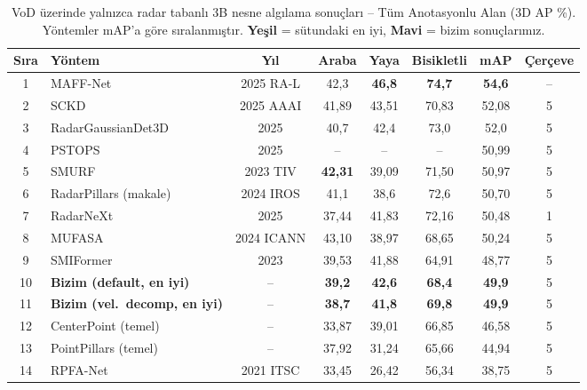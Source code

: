 \documentclass[a4paper,11pt]{article}
\newcommand{\best}[1]{\textcolor{bestcolor}{\textbf{#1}}}
\newcommand{\ours}[1]{\textcolor{ourscolor}{\textbf{#1}}}
\begin{document}
\begin{table}[H]
\centering
\caption{VoD üzerinde yalnızca radar tabanlı 3B nesne algılama sonuçları -- Tüm Anotasyonlu Alan (3D AP \%).
Yöntemler mAP'a göre sıralanmıştır. \best{Yeşil} = sütundaki en iyi, \ours{Mavi} = bizim sonuçlarımız.}
\label{tab:eaa}
\small
\renewcommand{\arraystretch}{1.15}
\begin{tabular}{@{}clcccccc@{}}
\toprule
\textbf{Sıra} & \textbf{Yöntem} & \textbf{Yıl} & \textbf{Araba} & \textbf{Yaya} & \textbf{Bisikletli} & \textbf{mAP} & \textbf{Çerçeve} \\
\midrule
1  & MAFF-Net \cite{maffnet}                & 2025 RA-L  & 42{,}3          & \best{46{,}8}   & \best{74{,}7}   & \best{54{,}6}  & -- \\
2  & SCKD \cite{sckd}                       & 2025 AAAI  & 41{,}89         & 43{,}51         & 70{,}83         & 52{,}08        & 5 \\
3  & RadarGaussianDet3D \cite{rgd3d}        & 2025       & 40{,}7          & 42{,}4          & 73{,}0          & 52{,}0         & 5 \\
4  & PSTOPS \cite{pstops}                   & 2025       & --              & --              & --              & 50{,}99        & 5 \\
5  & SMURF \cite{smurf}                     & 2023 TIV   & \best{42{,}31}  & 39{,}09         & 71{,}50         & 50{,}97        & 5 \\
6  & RadarPillars (makale) \cite{radarpillars}& 2024 IROS & 41{,}1          & 38{,}6          & 72{,}6          & 50{,}70        & 5 \\
7  & RadarNeXt \cite{radarnext}             & 2025       & 37{,}44         & 41{,}83         & 72{,}16         & 50{,}48        & 1 \\
8  & MUFASA \cite{mufasa}                   & 2024 ICANN & 43{,}10         & 38{,}97         & 68{,}65         & 50{,}24        & 5 \\
9  & SMIFormer \cite{smiformer}             & 2023       & 39{,}53         & 41{,}88         & 64{,}91         & 48{,}77        & 5 \\
\rowcolor{rowalt}
10 & \ours{Bizim (default, en iyi)}         & --         & \ours{39{,}2}   & \ours{42{,}6}   & \ours{68{,}4}   & \ours{49{,}9}  & 5 \\
\rowcolor{rowalt}
11 & \ours{Bizim (vel.\ decomp, en iyi)}    & --         & \ours{38{,}7}   & \ours{41{,}8}   & \ours{69{,}8}   & \ours{49{,}9}  & 5 \\
12 & CenterPoint (temel)                    & --         & 33{,}87         & 39{,}01         & 66{,}85         & 46{,}58        & 5 \\
13 & PointPillars (temel)                   & --         & 37{,}92         & 31{,}24         & 65{,}66         & 44{,}94        & 5 \\
14 & RPFA-Net \cite{rpfanet}                & 2021 ITSC  & 33{,}45         & 26{,}42         & 56{,}34         & 38{,}75        & 5 \\
\bottomrule
\end{tabular}
\end{table}
\end{document}
